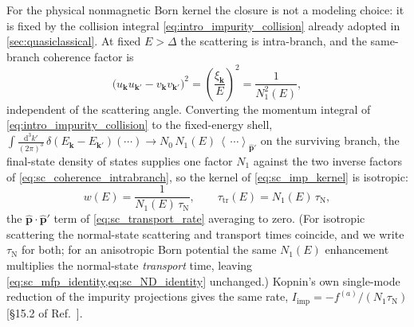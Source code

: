 \documentclass[
  aps,
  prb,
  preprint,
  superscriptaddress,
  longbibliography,
  nofootinbib
]{revtex4-2}
\newcommand{\dd}{\mathrm{d}}
\newcommand{\avg}[1]{\left\langle #1 \right\rangle}
\newcommand{\bk}{\mathbf{k}}
\newcommand{\bp}{\mathbf{p}}
\newcommand{\tautr}{\tau_{\mathrm{tr}}}
\newcommand{\DOS}{N_1}
\begin{document}
For the physical nonmagnetic Born kernel the closure is not a modeling
choice: it is fixed by the collision integral
\cref{eq:intro_impurity_collision} already adopted in
\cref{sec:quasiclassical}.
At fixed \(E>\Delta\) the scattering is intra-branch, and the
same-branch coherence factor is
\begin{equation}
  \bigl(u_{\bk}u_{\bk'}-v_{\bk}v_{\bk'}\bigr)^{2}
  =
  \left(\frac{\xi_{\bk}}{E}\right)^{2}
  =
  \frac{1}{\DOS^{2}(E)},
  \label{eq:sc_coherence_intrabranch}
\end{equation}
independent of the scattering angle. Converting the momentum integral
of \cref{eq:intro_impurity_collision} to the fixed-energy shell,
\(\int\!\frac{\dd^3k'}{(2\pi)^3}\,\delta(E_{\bk}-E_{\bk'})(\cdots)
\to N_0\,\DOS(E)\,\avg{\,\cdots}_{\hat{\bp}'}\) on the surviving
branch, the final-state density of states supplies one factor
\(\DOS\) against the two inverse factors of
\cref{eq:sc_coherence_intrabranch}, so the kernel of
\cref{eq:sc_imp_kernel} is isotropic:
\begin{equation}
  w(E)
  =
  \frac{1}{\DOS(E)\,\tau_{\mathrm N}},
  \qquad
  \tautr(E)
  =
  \DOS(E)\,\tau_{\mathrm N},
  \label{eq:sc_tau_closure}
\end{equation}
the \(\hat{\bp}\cdot\hat{\bp}'\) term of \cref{eq:sc_transport_rate}
averaging to zero. (For isotropic scattering the normal-state
scattering and transport times coincide, and we write
\(\tau_{\mathrm N}\) for both; for an anisotropic Born potential the
same \(\DOS(E)\) enhancement multiplies the normal-state
\emph{transport} time, leaving
\cref{eq:sc_mfp_identity,eq:sc_ND_identity} unchanged.) Kopnin's own single-mode reduction of
the impurity projections gives the same rate,
\(I_{\mathrm{imp}}=-f^{(a)}/(\DOS\tau_{\mathrm N})\)
[\S15.2 of Ref.~].
\end{document}
